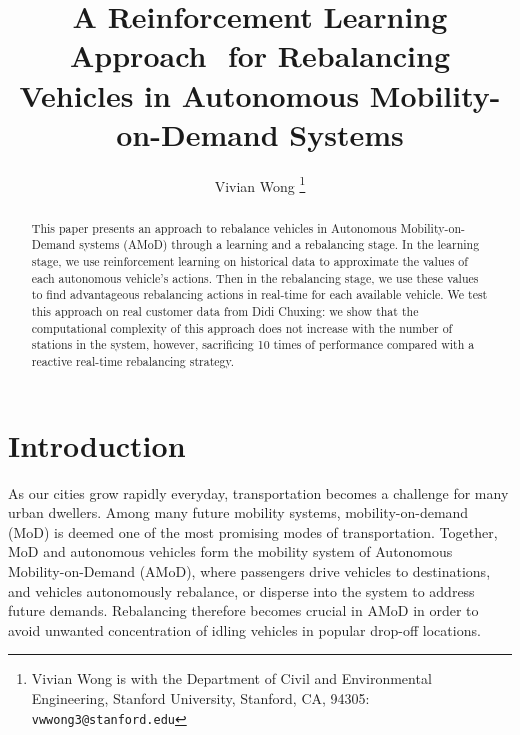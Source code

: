 \documentclass[letterpaper, 10 pt, conference]{ieeeconf}  %
\title{\LARGE \bf
A Reinforcement Learning Approach  for Rebalancing Vehicles in Autonomous Mobility-on-Demand Systems
}
\author{Vivian Wong%
\thanks{Vivian Wong is with the Department of Civil and Environmental Engineering, Stanford University, Stanford, CA, 94305:
        {\tt\small vwwong3@stanford.edu}}%
}
\begin{document}
\maketitle
\thispagestyle{empty}
\pagestyle{empty}


\begin{abstract}

This paper presents an approach to rebalance vehicles in Autonomous Mobility-on-Demand systems (AMoD) through a learning and a rebalancing stage. In the learning stage, we use reinforcement learning on historical data to approximate the values of each autonomous vehicle's actions. Then in the rebalancing stage, we use these values to find advantageous rebalancing actions in real-time for each available vehicle. We test this approach on real customer data from Didi Chuxing: we show that the computational complexity of this approach does not increase with the number of stations in the system, however, sacrificing 10 times of performance compared with a reactive real-time rebalancing strategy.  

\end{abstract}


\section{Introduction}

As our cities grow rapidly everyday, transportation becomes a challenge for many urban dwellers. Among many future mobility systems, mobility-on-demand (MoD) is deemed one of the most promising modes of transportation. Together, MoD and autonomous vehicles form the mobility system of Autonomous Mobility-on-Demand (AMoD), where passengers drive vehicles to destinations, and vehicles autonomously rebalance, or disperse into the system to address future demands. Rebalancing therefore becomes crucial in AMoD in order to avoid unwanted concentration of idling vehicles in popular drop-off locations. 
\end{document}
